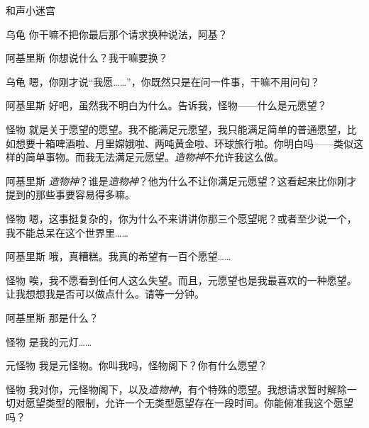 \begin{dialog}{和声小迷宫}
\begin{dialogue}
\begin{dialogue}
\begin{dialogue}
    \item[乌龟]你干嘛不把你最后那个请求换种说法，阿基？

    \item[阿基里斯]你想说什么？我干嘛要换？

    \item[乌龟]嗯，你刚才说“我愿……”，你既然只是在问一件事，干嘛不用问句？

    \item[阿基里斯]好吧，虽然我不明白为什么。告诉我，怪物——什么是元愿望？

    \item[怪物]就是关于愿望的愿望。我不能满足元愿望，我只能满足简单的普通愿望，比如想要十箱啤酒啦、月里嫦娥啦、两吨黄金啦、环球旅行啦。你明白吗——类似这样的简单事物。而我无法满足元愿望。\emph{造物神}不允许我这么做。

    \item[阿基里斯]\emph{造物神}？谁是\emph{造物神}？他为什么不让你满足元愿望？这看起来比你刚才提到的那些事要容易得多嘛。

    \item[怪物]嗯，这事挺复杂的，你为什么不来讲讲你那三个愿望呢？或者至少说一个，我不能总呆在这个世界里……

    \item[阿基里斯]哦，真糟糕。我真的希望有一百个愿望……

    \item[怪物]唉，我不愿看到任何人这么失望。而且，元愿望也是我最喜欢的一种愿望。让我想想我是否可以做点什么。请等一分钟。


    \item[阿基里斯]那是什么？

    \item[怪物]是我的元灯……


    \begin{dialogue}
      \item[元怪物]我是元怪物。你叫我吗，怪物阁下？你有什么愿望？
    \end{dialogue}

    \item[怪物]我对你，元怪物阁下，以及\emph{造物神}，有个特殊的愿望。我想请求暂时解除一切对愿望类型的限制，允许一个无类型愿望存在一段时间。你能俯准我这个愿望吗？


\end{dialogue}
\end{dialogue}
\end{dialogue}
\end{dialog}
